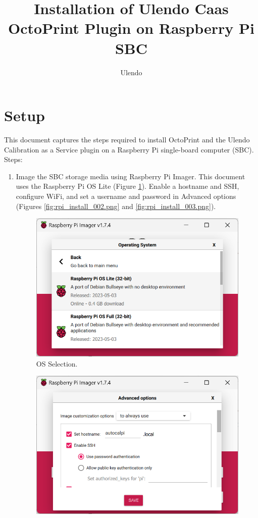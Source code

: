 \documentclass[12pt]{article}
\title{Installation of Ulendo Caas OctoPrint Plugin on Raspberry Pi SBC}
\author{Ulendo}
\date{\vspace{-5ex}} %
\begin{document}
\maketitle

\section{Setup}
This document captures the steps required to install OctoPrint and the Ulendo Calibration as a Service plugin on a Raspberry Pi single-board computer (SBC). Steps:
\begin{enumerate}
	\item Image the SBC storage media using Raspberry Pi Imager. This document uses the Raspberry Pi OS Lite (Figure \ref{fig:rpi_install_001.png}). Enable a hostname and SSH, configure WiFi, and set a username and password in Advanced options (Figures \ref{fig:rpi_install_002.png} and \ref{fig:rpi_install_003.png}).
\begin{figure}[H]
	\centering
	\includegraphics{rpi_install_001.png}
	\caption{OS Selection.}
	\label{fig:rpi_install_001.png}
\end{figure}
\begin{figure}[H]
	\centering
	\includegraphics{rpi_install_002.png}

\end{figure}
\end{enumerate}
\end{document}
